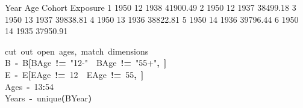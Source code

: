 \documentclass[a4paper]{article}
\newcommand{\hlnumber}[1]{\textcolor[rgb]{0.0823529411764706,0.0784313725490196,0.709803921568627}{#1}}%
\newcommand{\hlfunctioncall}[1]{\textcolor[rgb]{1,0,0}{#1}}%
\newcommand{\hlstring}[1]{\textcolor[rgb]{0.6,0.6,1}{#1}}%
\newcommand{\hlkeyword}[1]{\textcolor[rgb]{0,0,0}{\textbf{#1}}}%
\newcommand{\hlcomment}[1]{\textcolor[rgb]{0.8,0.8,0.8}{#1}}%
\newcommand{\hlassignement}[1]{\textcolor[rgb]{0.215686274509804,0.215686274509804,0.384313725490196}{\textbf{#1}}}%
\newcommand{\hlsymbol}[1]{\textcolor[rgb]{0,0,0}{#1}}%
\newcommand{\hlprompt}[1]{\textcolor[rgb]{0,0,0}{#1}}%
\newcommand{\hlstd}[1]{\textcolor[rgb]{0,0,0}{#1}}%
\newenvironment{Houtput}{\raggedright}{%
%
}
\renewenvironment{Schunk}{\vspace{\topsep}}{\vspace{\topsep}}
\begin{document}
\begin{Houtput}
\begin{Schunk}
\begin{Soutput}
  Year Age Cohort Exposure
1 1950  12   1938 41900.49
2 1950  12   1937 38499.18
3 1950  13   1937 39838.81
4 1950  13   1936 38822.81
5 1950  14   1936 39796.44
6 1950  14   1935 37950.91
\end{Soutput}
\ttfamily\noindent
\hlprompt{\usebox{\hlnormalsizeboxgreaterthan}{\ }}\hlcomment{\usebox{\hlnormalsizeboxhash}{\ }cut{\ }out{\ }open{\ }ages,{\ }match{\ }dimensions}\mbox{}
\normalfont
\hspace*{\fill}\\
\hlstd{}\ttfamily\noindent
\hlprompt{\usebox{\hlnormalsizeboxgreaterthan}{\ }}\hlsymbol{B}{\ }\hlassignement{\usebox{\hlnormalsizeboxlessthan}-}{\ }\hlsymbol{B}\hlkeyword{[}\hlsymbol{B}\hlkeyword{\usebox{\hlnormalsizeboxdollar}}\hlsymbol{Age}{\ }\hlkeyword{!=}{\ }\hlstring{"12-"}{\ }\hlkeyword{\usebox{\hlnormalsizeboxand}}{\ }\hlsymbol{B}\hlkeyword{\usebox{\hlnormalsizeboxdollar}}\hlsymbol{Age}{\ }\hlkeyword{!=}{\ }\hlstring{"55+"}\hlkeyword{,}{\ }\hlkeyword{]}\mbox{}
\normalfont
\hspace*{\fill}\\
\hlstd{}\ttfamily\noindent
\hlprompt{\usebox{\hlnormalsizeboxgreaterthan}{\ }}\hlsymbol{E}{\ }\hlassignement{\usebox{\hlnormalsizeboxlessthan}-}{\ }\hlsymbol{E}\hlkeyword{[}\hlsymbol{E}\hlkeyword{\usebox{\hlnormalsizeboxdollar}}\hlsymbol{Age}{\ }\hlkeyword{!=}{\ }\hlnumber{12}{\ }\hlkeyword{\usebox{\hlnormalsizeboxand}}{\ }\hlsymbol{E}\hlkeyword{\usebox{\hlnormalsizeboxdollar}}\hlsymbol{Age}{\ }\hlkeyword{!=}{\ }\hlnumber{55}\hlkeyword{,}{\ }\hlkeyword{]}\mbox{}
\normalfont
\hspace*{\fill}\\
\hlstd{}\ttfamily\noindent
\hlprompt{\usebox{\hlnormalsizeboxgreaterthan}{\ }}\hlsymbol{Ages}{\ }\hlassignement{\usebox{\hlnormalsizeboxlessthan}-}{\ }\hlnumber{13}\hlkeyword{:}\hlnumber{54}\mbox{}
\normalfont
\hspace*{\fill}\\
\hlstd{}\ttfamily\noindent
\hlprompt{\usebox{\hlnormalsizeboxgreaterthan}{\ }}\hlsymbol{Years}{\ }\hlassignement{\usebox{\hlnormalsizeboxlessthan}-}{\ }\hlfunctioncall{unique}\hlkeyword{(}\hlsymbol{B}\hlkeyword{\usebox{\hlnormalsizeboxdollar}}\hlsymbol{Year}\hlkeyword{)}\mbox{}
\normalfont
\hspace*{\fill}\\
\hlstd{}
\end{Schunk}
\end{Houtput}
\end{document}
